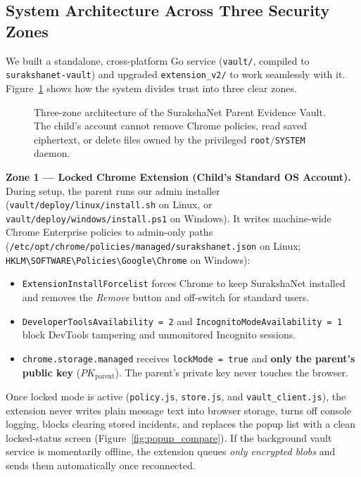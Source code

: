 \documentclass[11pt,a4paper]{article}
\begin{document}
\subsection{System Architecture Across Three Security Zones}
We built a standalone, cross-platform Go service (\texttt{vault/}, compiled to \texttt{surakshanet-vault}) and upgraded \texttt{extension\_v2/} to work seamlessly with it. Figure~\ref{fig:vault_arch} shows how the system divides trust into three clear zones.

\begin{figure}[H]
  \centering
  \resizebox{\textwidth}{!}{}
  \caption{Three-zone architecture of the SurakshaNet Parent Evidence Vault. The child's account cannot remove Chrome policies, read saved ciphertext, or delete files owned by the privileged \texttt{root}/\texttt{SYSTEM} daemon.}
  \label{fig:vault_arch}
\end{figure}

\textbf{Zone 1 --- Locked Chrome Extension (Child's Standard OS Account).}
During setup, the parent runs our admin installer (\nolinkurl{vault/deploy/linux/install.sh} on Linux, or \nolinkurl{vault/deploy/windows/install.ps1} on Windows). It writes machine-wide Chrome Enterprise policies \cite{chrome_enterprise_policies} to admin-only paths (\nolinkurl{/etc/opt/chrome/policies/managed/surakshanet.json} on Linux; \texttt{HKLM\textbackslash\allowbreak SOFTWARE\textbackslash\allowbreak Policies\textbackslash\allowbreak Google\textbackslash\allowbreak Chrome} on Windows):
\begin{itemize}
  \item \texttt{ExtensionInstallForcelist} forces Chrome to keep SurakshaNet installed and removes the \textit{Remove} button and off-switch for standard users.
  \item \texttt{DeveloperToolsAvailability = 2} and \texttt{IncognitoModeAvailability = 1} block DevTools tampering and unmonitored Incognito sessions.
  \item \texttt{chrome.storage.managed} receives \texttt{lockMode = true} and \textbf{only the parent's public key} ($PK_{\text{parent}}$). The parent's private key never touches the browser.
\end{itemize}

Once locked mode is active (\texttt{policy.js}, \texttt{store.js}, and \texttt{vault\_client.js}), the extension never writes plain message text into browser storage, turns off console logging, blocks clearing stored incidents, and replaces the popup list with a clean locked-status screen (Figure~\ref{fig:popup_compare}). If the background vault service is momentarily offline, the extension queues \textit{only encrypted blobs} and sends them automatically once reconnected.
\end{document}
